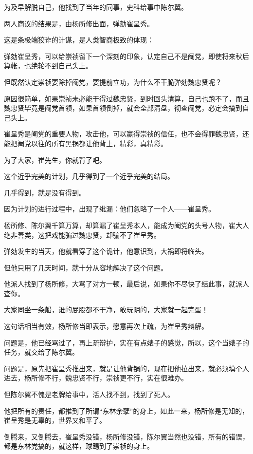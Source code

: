 \begin{multicols}{\theparacolNo}
		为及早解脱自己，他找到了当年的同事，吏科给事中陈尔翼。

		两人商议的结果是，由杨所修出面，弹劾崔呈秀。

		这是条极端狡诈的计谋，是人类智商极致的体现：

		弹劾崔呈秀，可以给崇祯留下一个深刻的印象，认定自己不是阉党，即使将来秋后算帐，也绝轮不到自己头上。

		但既然认定崇祯要除掉阉党，要提前立功，为什么不干脆弹劾魏忠贤呢？

		原因很简单，如果崇祯未必能干得过魏忠贤，到时回头清算，自己也跑不了，而且魏忠贤毕竟是阉党首领，如果首领倒掉，就会全部清盘，彻查阉党，必定会搞到自己头上。

		崔呈秀是阉党的重要人物，攻击他，可以赢得崇祯的信任，也不会得罪魏忠贤，还能把阉党以往的所有黑锅都让他背上，精彩，真精彩。

		为了大家，崔先生，你就背了吧。

		这个近乎完美的计划，几乎得到了一个近乎完美的结局。

		几乎得到，就是没有得到。

		因为计划的进行过程中，出现了纰漏：他们忽略了一个人——崔呈秀。

		杨所修、陈尔翼千算万算，却算漏了崔呈秀本人，能成为阉党的头号人物，崔大人绝非善类，这把戏能骗过魏忠贤，却骗不了崔呈秀。

		弹劾发生的当天，他就看穿了这个诡计，他意识到，大祸即将临头。

		但他只用了几天时间，就十分从容地解决了这个问题。

		他派人找到了杨所修，大骂了对方一顿，最后说，如果你不尽快了结此事，就派人查你。

		大家同坐一条船，谁的屁股都不干净，敢玩阴的，大家就一起完蛋！

		这句话相当有效，杨所修当即表示，愿意再次上疏，为崔呈秀辩解。

		问题是，他已经骂过了，再上疏辩护，实在有点婊子的感觉，所以，这个当婊子的任务，就交给了陈尔翼。

		问题是，原先把崔呈秀推出来，就是让他背锅的，现在把他拉出来，就必须填个人进去，杨所修不行，魏忠贤不行，崇祯更不行，实在很难办。

		但陈尔翼不愧是老牌给事中，活人找不到，找到了死人。

		他把所有的责任，都推到了所谓“东林余孽”的身上，如此一来，杨所修是无知的，崔呈秀是无辜的，世界又和平了。

		倒腾来，又倒腾去，崔呈秀没错，杨所修没错，陈尔翼当然也没错，所有的错误，都是东林党搞的，就这样，球踢到了崇祯的身上。


\end{multicols}
